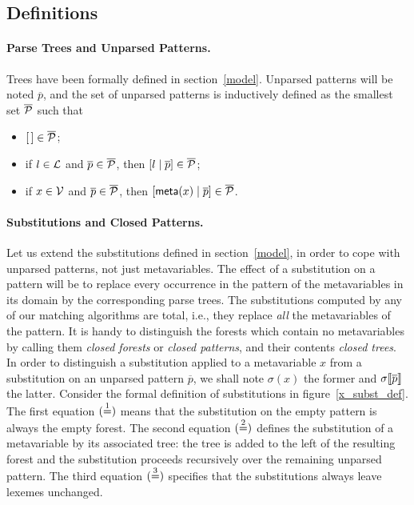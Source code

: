 \subsection{Definitions}
\label{backtracking:definitions}

\paragraph{Parse Trees and Unparsed Patterns.}

Trees have been formally defined in section~\ref{model}. Unparsed
patterns will be noted \(\overline{p}\), and the set of unparsed
patterns is inductively defined as the smallest set \(\overline{\cal
  P}\) such that
\begin{itemize}

  \item \([\,] \in \overline{\cal P}\);

  \item if \(l \in {\cal L}\) and \(\overline{p} \in \overline{\cal
    P}\), then \([{l}\mid{\overline{p}}] \in \overline{\cal P}\);

  \item if \(x \in {\cal V}\) and \(\overline{p} \in \overline{\cal
    P}\), then \([{\textsf{meta}(x)}\mid{\overline{p}}] \in \overline{\cal P}\).

\end{itemize}

\paragraph{Substitutions and Closed Patterns.} 

Let us extend the substitutions defined in section~\ref{model}, in
order to cope with unparsed patterns, not just meta\-variables. The
effect of a substitution on a pattern will be to replace every
occurrence in the pattern of the meta\-variables in its domain by the
corresponding parse trees. The substitutions computed by any of our
matching algorithms are total, i.e., they replace \emph{all} the
meta\-variables of the pattern. It is handy to distinguish the forests
which contain no meta\-variables by calling them \emph{closed forests}
or \emph{closed patterns}, and their contents \emph{closed trees}. In
order to distinguish a substitution applied to a meta\-variable \(x\)
from a substitution on an unparsed pattern \(\overline{p}\), we shall
note \(\sigma(x)\) the former and \({\sigma}\llbracket{\overline{p}}\rrbracket\) the
latter. Consider the formal definition of substitutions in
figure~\ref{x_subst_def}.  The first equation \((\stackrel{1}{=})\) means that
the substitution on the empty pattern is always the empty forest. The
second equation \((\stackrel{2}{=})\) defines the substitution of a
meta\-variable by its associated tree: the tree is added to the left
of the resulting forest and the substitution proceeds recursively over
the remaining unparsed pattern. The third equation \((\stackrel{3}{=})\)
specifies that the substitutions always leave lexemes unchanged.

